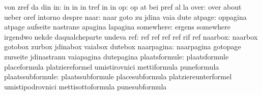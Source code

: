                                   von                              zref
                                  da                               din
                              in: in                               in
                                  in                               tref
                                  in                               in
                              op: op                               at
                                  bei                              pref
                                  al                               la %
                            over: over                             about
                                  ueber                            oref
                                  intorno                          despre
                            naar: naar                             goto
                                  zu                               jdina
                                  vaia                             dute
                          atpage: oppagina                         atpage
                                  aufseite                         nastrane
                                  apagina                          lapagina
                       somewhere: ergens                           somewhere
                                  irgendwo                         nekde
                                  daqualcheparte                   undeva
                             ref: ref                              ref
                                  ref                              ref
                                  rif                              ref
                         naarbox: naarbox                          gotobox
                                  zurbox                           jdinabox
                                  vaiabox                          dutebox  %
                      naarpagina: naarpagina                       gotopage
                                  zurseite                         jdinastranu
                                  vaiapagina                       dutepagina
                   plaatsformule: plaatsformule                    placeformula
                                  platziereformel                  umistirovnici
                                  mettiformula                     puneformula
                plaatssubformule: plaatssubformule                 placesubformula
                                  platziereunterformel             umistipodrovnici
                                  mettisottoformula                punesubformula
